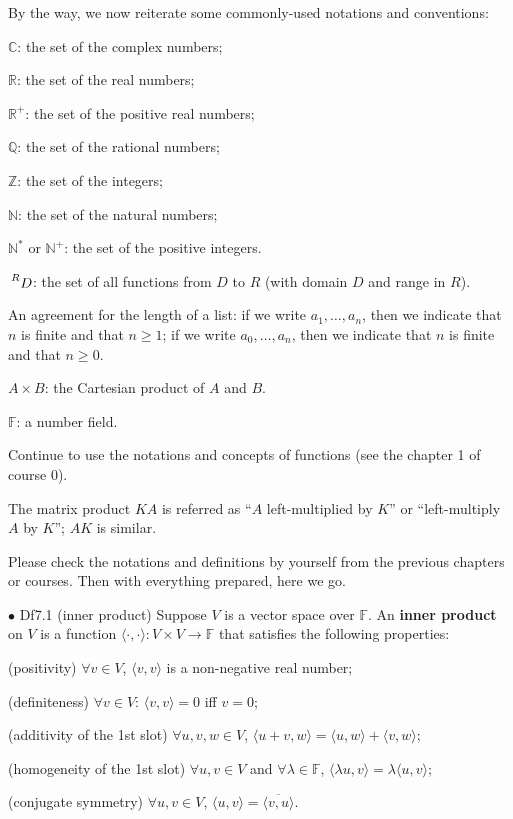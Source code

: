 \documentclass{article}
\begin{document}
By the way, we now reiterate some commonly-used notations and conventions:
\begin{compactenum}
    \item $\mathbb{C}$: the set of the complex numbers;
    \item $\mathbb{R}$: the set of the real numbers;
    \item $\mathbb{R}^+$: the set of the positive real numbers;
    \item $\mathbb{Q}$: the set of the rational numbers;
    \item $\mathbb{Z}$: the set of the integers;
    \item $\mathbb{N}$: the set of the natural numbers;
    \item $\mathbb{N^\ast}$ or $\mathbb{N}^+$: the set of the positive integers.
    \item $\sideset{^R}{}{\mathop{D}}$: the set of all functions from $D$ to $R$ (with domain $D$ and range in $R$).
    \item An agreement for the length of a list: if we write $a_1, \dots, a_n$, then we indicate that $n$ is finite and that $n\geq 1$; if we write $a_0, \dots, a_n$, then we indicate that $n$ is finite and that $n\geq 0$.
    \item $A\times B$: the Cartesian product of $A$ and $B$.
    \item $\mathbb{F}$: a number field.
    \item Continue to use the notations and concepts of functions (see the chapter 1 of course 0).
    \item The matrix product $KA$ is referred as ``$A$ left-multiplied by $K$'' or ``left-multiply $A$ by $K$''; $AK$ is similar.
\end{compactenum} 
Please check the notations and definitions by yourself from the previous chapters or courses. Then with everything prepared, here we go.

\begin{Df}{$\bullet$ Df7.1 (inner product)}
    Suppose $V$ is a vector space over $\mathbb{F}$. An \textbf{inner product} on $V$ is a function $\langle \cdot, \cdot \rangle: V\times V\to \mathbb{F}$ that satisfies the following properties:
    \begin{compactenum}
        \item (positivity) $\forall v\in V$, $\langle v, v\rangle$ is a non-negative real number;
        \item (definiteness) $\forall v\in V$: $\langle v, v\rangle = 0$ iff $v=0$;
        \item (additivity of the 1st slot) $\forall u, v, w\in V$, $\langle u+v, w\rangle = \langle u, w\rangle + \langle v, w\rangle$;
        \item (homogeneity of the 1st slot) $\forall u, v\in V$ and $\forall \lambda\in \mathbb{F}$, $\langle \lambda u, v\rangle = \lambda \langle u, v\rangle$;
        \item (conjugate symmetry) $\forall u, v\in V$, $\langle u, v\rangle = \overline{\langle v, u\rangle}$.
    \end{compactenum}
\end{Df}
\end{document}
